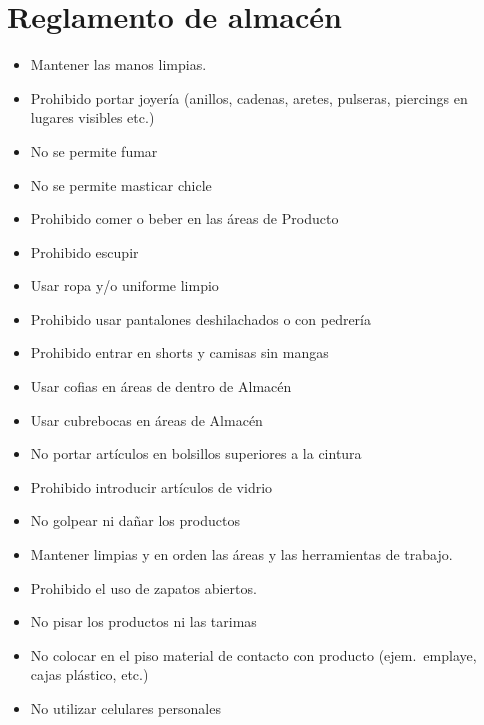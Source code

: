 \renewcommand{\MayorVer}{2}
\renewcommand{\MenorVer}{1}
\renewcommand{\Codigo}{BPD-5-CI/CE}
\renewcommand{\FechaPub}{2023--01}
\renewcommand{\Titulo}{Reglamento de almacén}
\section{\Titulo}

\begin{itemize}
	\item Mantener las manos limpias.
	\item Prohibido portar joyería (anillos, cadenas, aretes, pulseras, piercings en lugares visibles etc.)
	\item No se permite fumar
	\item No se permite masticar chicle
	\item Prohibido comer o beber en las áreas de Producto
	\item Prohibido escupir
	\item Usar ropa y/o uniforme limpio
	\item Prohibido usar pantalones deshilachados o con pedrería
	\item Prohibido entrar en shorts y camisas sin mangas
	\item Usar cofias en áreas de dentro de Almacén
	\item Usar cubrebocas en áreas de Almacén
	\item No portar artículos en bolsillos superiores a la cintura
	\item Prohibido introducir artículos de vidrio
	\item No golpear ni dañar los productos
	\item Mantener limpias y en orden las áreas y las herramientas de trabajo.
	\item Prohibido el uso de zapatos abiertos.
	\item No pisar los productos ni las tarimas
	\item No colocar en el piso material de contacto con producto (ejem.\ emplaye, cajas plástico, etc.)
	\item No utilizar celulares personales
\end{itemize}

